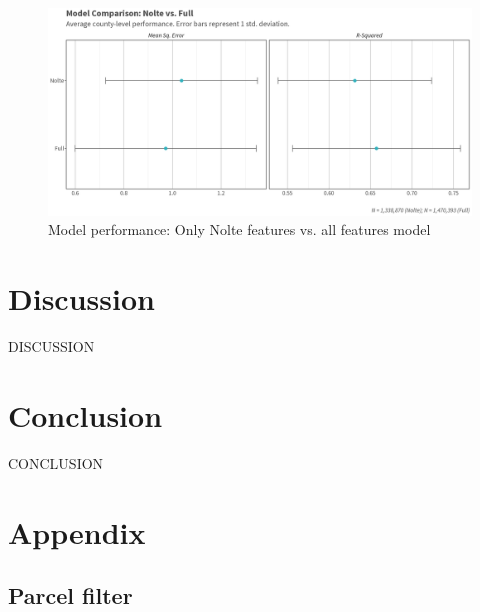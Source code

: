 \documentclass[12pt]{article}
\begin{document}
\newpage

\begin{figure}
    \centering
    \includegraphics[width=6in]{figures/nolte_full_compare.png}
    \caption{Model performance: Only Nolte features vs. all features model}
    \label{fig:nolte_full_compare}
\end{figure}

\newpage

\section{Discussion}

DISCUSSION

\newpage

\section{Conclusion}

CONCLUSION

\newpage

\section{Appendix}


\subsection{Parcel filter}
\end{document}
